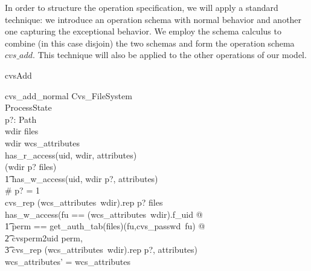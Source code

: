 In order to structure the operation specification, we will apply a standard
technique: we introduce an operation schema with normal behavior and another
one capturing the exceptional behavior. We employ the schema calculus to
combine (in this case disjoin) the two schemas and form the operation schema
$cvs\_add$. This technique will also be applied to the other operations of our
model.
\begin{doc}{cvsAdd}
  \begin{schema}{cvs\_add\_normal}
    \Delta Cvs\_FileSystem\\
    \Xi ProcessState \\
    p?: Path \\
    \where
    wdir \isdirin files \\
    wdir \in \dom wcs\_attributes \\
    has\_r\_access(uid, wdir, attributes) \\
   (wdir \cat p? \isdirin files) \implies  \\
   \t1 has\_w\_access(uid, wdir \cat p?, attributes) \\
    \# p? = 1 \\
    cvs\_rep \cat (wcs\_attributes~wdir).rep \cat p? \notin \dom files \\
    has\_w\_access(\LET fu == (wcs\_attributes~wdir).f\_uid @  \\
    \t1 \LET perm == get\_auth\_tab(files)(fu,cvs\_passwd~fu) @ \\
    \t2 cvsperm2uid perm, \\
    \t3 cvs\_rep \cat (wcs\_attributes~wdir).rep \cat p?, attributes) \\ 
    wcs\_attributes' = wcs\_attributes \\

\end{schema}
\end{doc}
